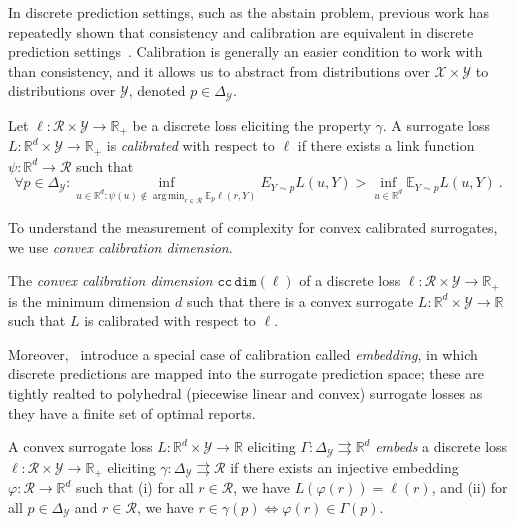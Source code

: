\documentclass[anon,12pt]{colt2021} %
\newcommand{\reals}{\mathbb{R}}
\newcommand{\simplex}{\Delta_\Y}
\newcommand{\ccdim}{\mathtt{cc\,dim}}
\newcommand{\E}{\mathbb{E}}
\newcommand{\R}{\mathcal{R}}
\newcommand{\X}{\mathcal{X}}
\newcommand{\Y}{\mathcal{Y}}
\newcommand{\toto}{\rightrightarrows}
\DeclareMathOperator*{\argmin}{arg\,min}
\begin{document}
In discrete prediction settings, such as the abstain problem, previous work has repeatedly shown that consistency and calibration are equivalent in discrete prediction settings~\citep{zhang2004statistical,bartlett2006convexity,tewari2007consistency,ramaswamy2016convex}.
Calibration is generally an easier condition to work with than consistency, and it allows us to abstract from distributions over $\X \times \Y$ to distributions over $\Y$, denoted $p \in \simplex$. 

\begin{definition}[Calibrated]\label{def:calibrated}
Let $\ell : \R \times \Y \to \reals_+$ be a discrete loss eliciting the property $\gamma$.
A surrogate loss $L : \reals^d \times \Y \to \reals_+$ is \emph{calibrated} with respect to $\ell$ if there exists a link function $\psi: \reals^d \to \R$ such that
\begin{equation}\label{eq:calibration}
\forall p \in \simplex: \inf_{u \in \reals^d : \psi(u) \not \in \argmin_{r \in \R}\E_p\ell(r,Y)} E_{Y\sim p}L(u,Y) > \inf_{u \in \reals^d} \E_{Y\sim p} L(u,Y)~.~
\end{equation}	
\end{definition}

To understand the measurement of complexity for convex calibrated surrogates, we use \emph{convex calibration dimension}.

\begin{definition}\label{def:ccdim}
	The \emph{convex calibration dimension} $\ccdim(\ell)$ of a discrete loss $\ell : \R \times \Y \to \reals_+$ is the minimum dimension $d$ such that there is a convex surrogate $L : \reals^d \times \Y \to \reals$ such that $L$ is calibrated with respect to $\ell$.
\end{definition}

Moreover,~\citet{finocchiaro2019embedding} introduce a special case of calibration called \emph{embedding}, in which discrete predictions are mapped into the surrogate prediction space; these are tightly realted to polyhedral (piecewise linear and convex) surrogate losses as they have a finite set of optimal reports.

\begin{definition}[Embeds]
	A convex surrogate loss $L : \reals^d \times \Y \to \reals$ eliciting $\Gamma: \simplex \toto \reals^d$ \emph{embeds} a discrete loss $\ell : \R \times \Y \to \reals_+$ eliciting $\gamma : \simplex \toto \R$ if there exists an injective embedding $\varphi : \R \to \reals^d$ such that (i) for all $r \in \R$, we have $L(\varphi(r)) = \ell(r)$, and (ii) for all $p \in \simplex$ and $r \in \R$, we have $r \in \gamma(p) \iff \varphi(r) \in \Gamma(p)$.
\end{definition}
\end{document}
